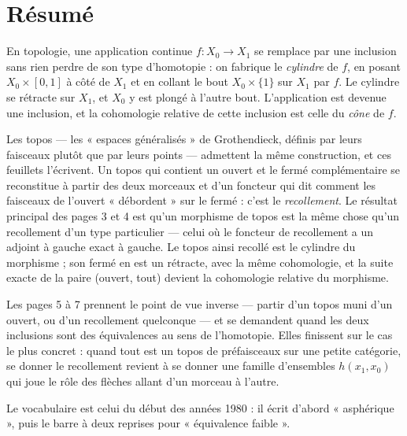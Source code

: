 \documentclass[11pt,a4paper]{article}
\begin{document}
\section*{Résumé}

\begin{resume}
En topologie, une application continue $f : X_{0} \to X_{1}$ se remplace par
une inclusion sans rien perdre de son type d'homotopie : on fabrique le
\emph{cylindre} de $f$, en posant $X_{0} \times [0,1]$ à côté de $X_{1}$ et en
collant le bout $X_{0} \times \{1\}$ sur $X_{1}$ par $f$. Le cylindre se rétracte
sur $X_{1}$, et $X_{0}$ y est plongé à l'autre bout. L'application est devenue
une inclusion, et la cohomologie relative de cette inclusion est celle du
\emph{cône} de $f$.

Les topos --- les « espaces généralisés » de Grothendieck, définis par leurs
faisceaux plutôt que par leurs points --- admettent la même construction, et
ces feuillets l'écrivent. Un topos qui contient un ouvert et le fermé
complémentaire se reconstitue à partir des deux morceaux et d'un foncteur qui
dit comment les faisceaux de l'ouvert « débordent » sur le fermé : c'est le
\emph{recollement}. Le résultat principal des pages 3 et 4 est qu'un morphisme
de topos est la même chose qu'un recollement d'un type particulier --- celui où
le foncteur de recollement a un adjoint à gauche exact à gauche. Le topos ainsi
recollé est le cylindre du morphisme ; son fermé en est un rétracte, avec la
même cohomologie, et la suite exacte de la paire (ouvert, tout) devient la
cohomologie relative du morphisme.

Les pages 5 à 7 prennent le point de vue inverse --- partir d'un topos muni
d'un ouvert, ou d'un recollement quelconque --- et se demandent quand les deux
inclusions sont des équivalences au sens de l'homotopie. Elles finissent sur
le cas le plus concret : quand tout est un topos de préfaisceaux sur une petite
catégorie, se donner le recollement revient à se donner une famille
d'ensembles $h(x_{1}, x_{0})$ qui joue le rôle des flèches allant d'un morceau
à l'autre.

Le vocabulaire est celui du début des années 1980 : il écrit d'abord
« asphérique », puis le barre à deux reprises pour « équivalence faible ».

\end{resume}
\end{document}
